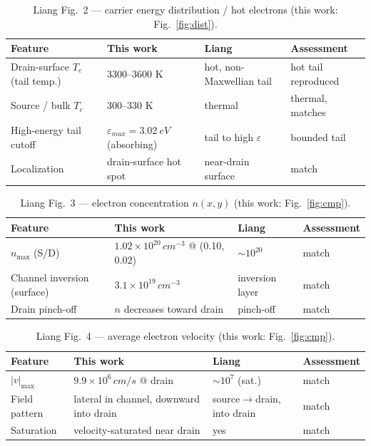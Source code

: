\documentclass[11pt]{article}
\newcommand{\eps}{\varepsilon}
\begin{document}
\begin{table}[h]\centering\small
\caption{Liang Fig.~2 --- carrier energy distribution / hot electrons (this work: Fig.~\ref{fig:dist}).}\label{tab:f2}
\begin{tabular}{p{3.5cm}p{3.9cm}p{2.9cm}p{3.2cm}}
\toprule
Feature & This work & Liang & Assessment \\
\midrule
Drain-surface $T_e$ (tail temp.) & 3300--3600 K & hot, non-Maxwellian tail & hot tail reproduced \\
Source / bulk $T_e$ & 300--330 K & thermal & thermal, matches \\
High-energy tail cutoff & $\eps_{max}=\SI{3.02}{eV}$ (absorbing) & tail to high $\eps$ & bounded tail \\
Localization & drain-surface hot spot & near-drain surface & match \\
\bottomrule
\end{tabular}
\end{table}

\begin{table}[h]\centering\small
\caption{Liang Fig.~3 --- electron concentration $n(x,y)$ (this work: Fig.~\ref{fig:cmp}).}\label{tab:f3}
\begin{tabular}{p{3.5cm}p{3.9cm}p{2.9cm}p{3.2cm}}
\toprule
Feature & This work & Liang & Assessment \\
\midrule
$n_{\max}$ (S/D) & $1.02\times10^{20}\,\si{cm^{-3}}$ @ (0.10,\,0.02) & $\sim\!10^{20}$ & match \\
Channel inversion (surface) & $3.1\times10^{19}\,\si{cm^{-3}}$ & inversion layer & match \\
Drain pinch-off & $n$ decreases toward drain & pinch-off & match \\
\bottomrule
\end{tabular}
\end{table}

\begin{table}[h]\centering\small
\caption{Liang Fig.~4 --- average electron velocity (this work: Fig.~\ref{fig:cmp}).}\label{tab:f4}
\begin{tabular}{p{3.5cm}p{3.9cm}p{2.9cm}p{3.2cm}}
\toprule
Feature & This work & Liang & Assessment \\
\midrule
$|v|_{\max}$ & $9.9\times10^{6}\,\si{cm/s}$ @ drain & $\sim\!10^{7}$ (sat.) & match \\
Field pattern & lateral in channel, downward into drain & source$\to$drain, into drain & match \\
Saturation & velocity-saturated near drain & yes & match \\
\bottomrule
\end{tabular}
\end{table}
\end{document}
